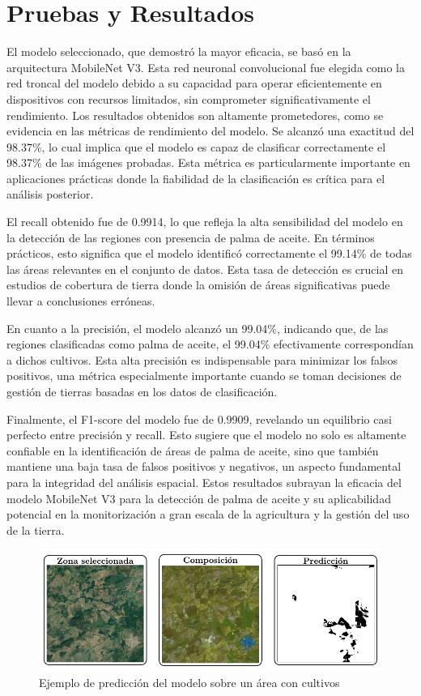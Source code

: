 \section{Pruebas y Resultados}
El modelo seleccionado, que demostró la mayor eficacia, se basó en la arquitectura MobileNet V3. Esta red neuronal convolucional fue elegida como la red troncal del modelo debido a su capacidad para operar eficientemente en dispositivos con recursos limitados, sin comprometer significativamente el rendimiento. Los resultados obtenidos son altamente prometedores, como se evidencia en las métricas de rendimiento del modelo.  Se alcanzó una exactitud del 98.37\%, lo cual implica que el modelo es capaz de clasificar correctamente el 98.37\% de las imágenes probadas. Esta métrica es particularmente importante en aplicaciones prácticas donde la fiabilidad de la clasificación es crítica para el análisis posterior.

El recall obtenido fue de 0.9914, lo que refleja la alta sensibilidad del modelo en la detección de las regiones con presencia de palma de aceite. En términos prácticos, esto significa que el modelo identificó correctamente el 99.14\% de todas las áreas relevantes en el conjunto de datos. Esta tasa de detección es crucial en estudios de cobertura de tierra donde la omisión de áreas significativas puede llevar a conclusiones erróneas.

En cuanto a la precisión, el modelo alcanzó un 99.04\%, indicando que, de las regiones clasificadas como palma de aceite, el 99.04\% efectivamente correspondían a dichos cultivos. Esta alta precisión es indispensable para minimizar los falsos positivos, una métrica especialmente importante cuando se toman decisiones de gestión de tierras basadas en los datos de clasificación.

Finalmente, el F1-score del modelo fue de 0.9909, revelando un equilibrio casi perfecto entre precisión y recall. Esto sugiere que el modelo no solo es altamente confiable en la identificación de áreas de palma de aceite, sino que también mantiene una baja tasa de falsos positivos y negativos, un aspecto fundamental para la integridad del análisis espacial. Estos resultados subrayan la eficacia del modelo MobileNet V3 para la detección de palma de aceite y su aplicabilidad potencial en la monitorización a gran escala de la agricultura y la gestión del uso de la tierra.

\begin{figure}[t]
 \centering
 \includegraphics[width=\textwidth]{example_selected_zone}
 \caption{Ejemplo de predicción del modelo sobre un área con cultivos}
 \label{fig:example_selected_zone}
\end{figure}

